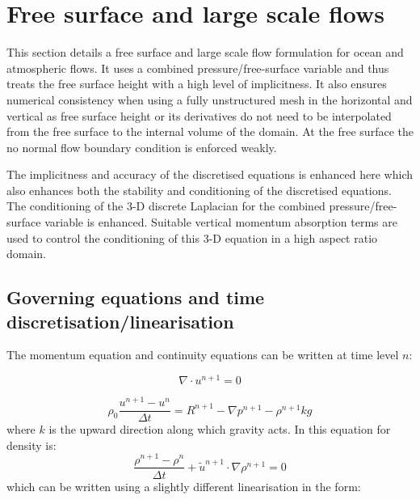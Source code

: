 \pagebreak


\section{Free surface and large scale flows}
\label{Free surface and large scale flows}


This section  details a free surface and large scale flow formulation 
for ocean and atmospheric flows. 
It uses a combined pressure/free-surface 
variable and thus treats the free surface height with a 
high level of implicitness. It also ensures numerical 
consistency when using a fully unstructured mesh in the horizontal 
and vertical as free surface height or its derivatives do not 
need to be interpolated from the free surface to the internal volume 
of the domain. 
At the free surface the no normal flow boundary 
condition is enforced weakly. 

The implicitness and accuracy of the discretised equations is enhanced 
here which also enhances both the stability and conditioning 
of the discretised equations. 
The conditioning of the 3-D discrete 
Laplacian for the combined pressure/free-surface variable is 
enhanced. Suitable vertical momentum 
absorption terms are used to control the 
conditioning of this 3-D equation in a high aspect ratio 
domain. 



\subsection{Governing equations and time discretisation/linearisation}
\noindent 
The momentum equation and continuity equations can be written at 
time level $n$: 

\begin{equation}
\nabla \cdot u^{n+1}=0
\label{d1eqn}
\end{equation}

\begin{equation}
\rho_0 \frac{u^{n+1}- u^n}{\Delta t}= R^{n+1} - \nabla p^{n+1} - \rho^{n+1} k g 
\label{ns}
\end{equation}
where $k$ is the upward direction along which gravity acts.  
In this equation for density is: 
\begin{equation}
\frac{\rho^{n+1} -\rho^n}{\Delta t} + {\tilde u}^{n+1}\cdot \nabla \rho^{n+1}=0 
\label{d2eqn}
\end{equation}
which can be written using a slightly different linearisation in the form:
 
